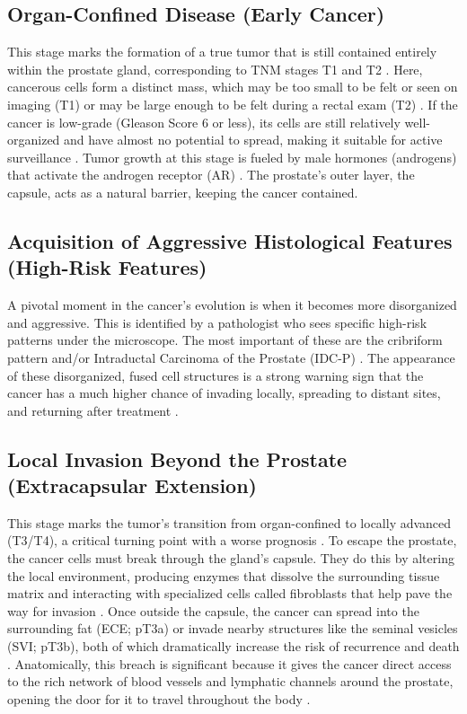 \documentclass[11pt, a4paper]{article}
\begin{document}
\subsection{Organ-Confined Disease (Early Cancer)}
This stage marks the formation of a true tumor that is still contained entirely within the prostate gland, corresponding to TNM stages T1 and T2 \cite{PasoglouMichoux2016, UnknownAuthor2017}. Here, cancerous cells form a distinct mass, which may be too small to be felt or seen on imaging (T1) or may be large enough to be felt during a rectal exam (T2) \cite{CaglicKovac2019, OliveiraFerreira2023}. If the cancer is low-grade (Gleason Score 6 or less), its cells are still relatively well-organized and have almost no potential to spread, making it suitable for active surveillance \cite{UnknownAuthor2017, DrostOsses2019}. Tumor growth at this stage is fueled by male hormones (androgens) that activate the androgen receptor (AR) \cite{UnknownAuthor2014, MartinCaraballo2024}. The prostate's outer layer, the capsule, acts as a natural barrier, keeping the cancer contained.

\subsection{Acquisition of Aggressive Histological Features (High-Risk Features)}
A pivotal moment in the cancer's evolution is when it becomes more disorganized and aggressive. This is identified by a pathologist who sees specific high-risk patterns under the microscope. The most important of these are the cribriform pattern and/or Intraductal Carcinoma of the Prostate (IDC-P) \cite{GordetskySchaffer2022, HesterbergGordetsky2021, BernardinoSayyid2023}. The appearance of these disorganized, fused cell structures is a strong warning sign that the cancer has a much higher chance of invading locally, spreading to distant sites, and returning after treatment \cite{HesterbergGordetsky2021, GaoZhang2020}.

\subsection{Local Invasion Beyond the Prostate (Extracapsular Extension)}
This stage marks the tumor's transition from organ-confined to locally advanced (T3/T4), a critical turning point with a worse prognosis \cite{OliveiraFerreira2023, CarpagnanoEusebi2020}. To escape the prostate, the cancer cells must break through the gland's capsule. They do this by altering the local environment, producing enzymes that dissolve the surrounding tissue matrix and interacting with specialized cells called fibroblasts that help pave the way for invasion \cite{UnknownAuthor2012, PenetKakkad2017}. Once outside the capsule, the cancer can spread into the surrounding fat (ECE; pT3a) or invade nearby structures like the seminal vesicles (SVI; pT3b), both of which dramatically increase the risk of recurrence and death \cite{FanXie2022, ErbayOzden2020}. Anatomically, this breach is significant because it gives the cancer direct access to the rich network of blood vessels and lymphatic channels around the prostate, opening the door for it to travel throughout the body \cite{FanXie2022}.
\end{document}
